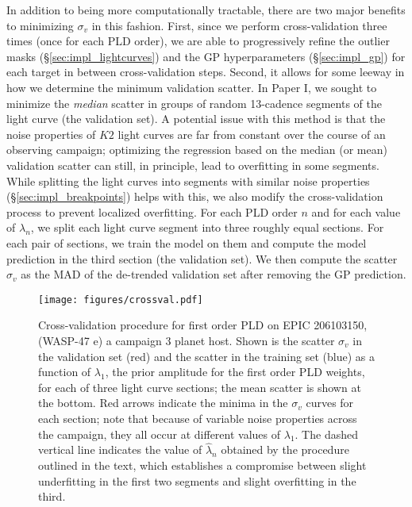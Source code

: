 \documentclass[]{emulateapj}
\begin{document}
In addition to being more computationally tractable, there are two major benefits to
minimizing $\sigma_v$ in this fashion. First, since we perform cross-validation three times
(once for each PLD order), we are able to progressively refine the outlier masks (\S\ref{sec:impl_lightcurves}) and
the GP hyperparameters (\S\ref{sec:impl_gp}) for each target in between cross-validation steps. Second, it
allows for some leeway in how we determine the minimum validation scatter. In Paper I, 
we sought to minimize the \emph{median} scatter in groups of random 13-cadence segments 
of the light curve (the validation set). A potential issue with this method is that 
the noise properties of $K2$ light curves are far from constant over the course of
an observing campaign; optimizing the regression based on the median (or mean) validation 
scatter can still, in principle, lead to overfitting in some segments. While splitting the
light curves into segments with similar noise properties (\S\ref{sec:impl_breakpoints})
helps with this, we also modify the cross-validation process to prevent localized
overfitting. For each PLD order $n$ and for each value of $\lambda_n$, 
we split each light curve segment 
into three roughly equal sections. For each pair of sections, we train the model on
them and compute the model prediction in the third section (the validation set). We
then compute the scatter $\sigma_v$ as the MAD of the
de-trended validation set after removing the GP prediction.

\begin{figure}[ht]
  \begin{center}
      \texttt{[image: figures/crossval.pdf]}
       \caption{Cross-validation procedure for first order PLD on EPIC 206103150,
       (WASP-47 e) a campaign 3 planet host. Shown is the scatter $\sigma_v$ in the validation
       set (red) and the scatter in the training set (blue) as a function of $\lambda_1$,
       the prior amplitude for the first order PLD weights, for each of three light curve
       sections; the mean scatter is shown at the bottom. Red arrows indicate the minima
       in the $\sigma_v$ curves for each section; note that because of variable noise
       properties across the campaign, they all occur at different values of $\lambda_1$.
       The dashed vertical line indicates the value of $\hat{\lambda}_n$ obtained by the
       procedure outlined in the text, which establishes a compromise between 
       slight underfitting in the first two segments and slight overfitting in the
       third.
       }
     \label{fig:crossval}
  \end{center}
\end{figure}
\end{document}
